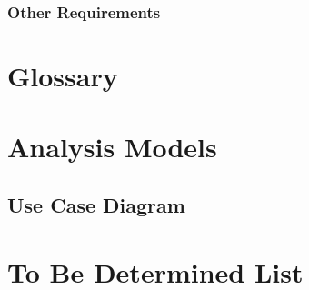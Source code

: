 \documentclass{article}
\begin{document}
\subsubsection{Other Requirements}

\newpage
\appendix


\section{Glossary}


\section{Analysis Models}

\subsection{Use Case Diagram}

\section{To Be Determined List}
\end{document}
